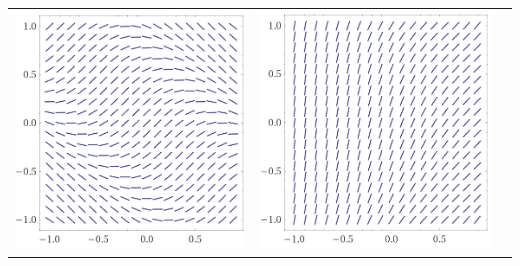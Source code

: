\setlength{\len}{150pt}
\begin{tabular}{ccc}
	\includegraphics*[height=\len]{images/module9-graph1}
		& \includegraphics*[height=\len]{images/module9-graph2}

\end{tabular}
